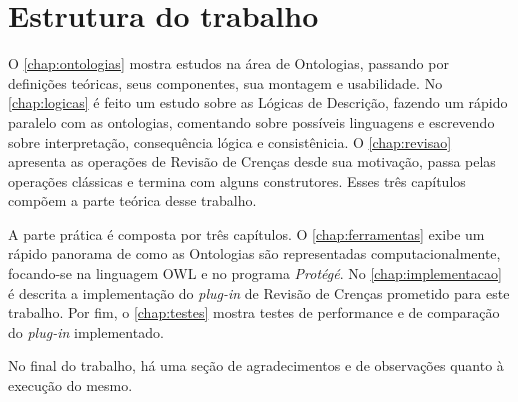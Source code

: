 \section{Estrutura do trabalho}

O \autoref{chap:ontologias} mostra estudos na área de Ontologias, passando por definições teóricas, seus componentes, sua montagem e usabilidade. No \autoref{chap:logicas} é feito um estudo sobre as Lógicas de Descrição, fazendo um rápido paralelo com as ontologias, comentando sobre possíveis linguagens e escrevendo sobre interpretação, consequência lógica e consistênicia. O \autoref{chap:revisao} apresenta as operações de Revisão de Crenças desde sua motivação, passa pelas operações clássicas e termina com alguns construtores. Esses três capítulos compõem a parte teórica desse trabalho.

A parte prática é composta por três capítulos. O \autoref{chap:ferramentas} exibe um rápido panorama de como as Ontologias são representadas computacionalmente, focando-se na linguagem OWL e no programa \textit{Protégé}. No \autoref{chap:implementacao} é descrita a implementação do \textit{plug-in} de Revisão de Crenças prometido para este trabalho. Por fim, o \autoref{chap:testes} mostra testes de performance e de comparação do \textit{plug-in} implementado.

No final do trabalho, há uma seção de agradecimentos e de observações quanto à execução do mesmo.